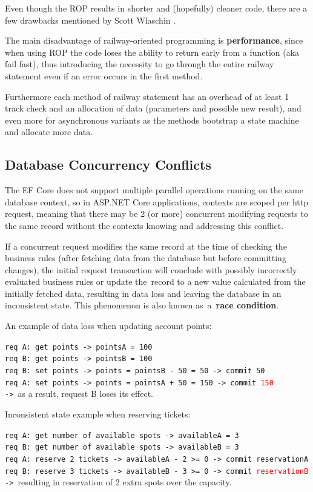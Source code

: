 Even though the ROP results in shorter and (hopefully) cleaner code, there are a few drawbacks mentioned by Scott Wlaschin \cite{scott_wlaschin:norop}.

The main disadvantage of railway-oriented programming is \textbf{performance}, since when using ROP the code loses the ability to return early from a function (aka fail fast), thus introducing the necessity to go through the entire railway statement even if an error occurs in the first method.

Furthermore each method of railway statement has an overhead of at least 1 track check and an allocation of data (parameters and possible new result), and even more for asynchronous variants as the methods bootstrap a state machine and allocate more data.

\subsection{Database Concurrency Conflicts}
\label{dev:conccurency_conflicts}
The EF Core does not support multiple parallel operations running on the same database context, so in ASP.NET Core applications, contexts are scoped per http request, meaning that there may be 2 (or more) concurrent modifying requests to the same record without the contexts knowing and addressing this conflict.

If a concurrent request modifies the same record at the time of checking the business rules (after fetching data from the database but before committing changes), the initial request transaction will conclude with possibly incorrectly evaluated business rules or update the~record to a new value calculated from the initially fetched data, resulting in data loss and leaving the database in an inconsistent state. This phenomenon is also known as~a~\textbf{race condition}.

An example of data loss when updating account points:

\texttt{req A: get points -> pointsA = 100\\
req B: get points -> pointsB = 100\\
req B: set points -> points = pointsB - 50 = 50 -> commit 50\\
req A: set points -> points = pointsA + 50 = 150 -> commit \textcolor{red}{150}\\
-> }as a result, request B loses its effect.

Inconsistent state example when reserving tickets:

\texttt{req A: get number of available spots -> availableA = 3\\
req B: get number of available spots -> availableB = 3\\
req A: reserve 2 tickets -> availableA - 2 >= 0 -> commit reservationA\\
req B: reserve 3 tickets -> availableB - 3 >= 0 -> commit \textcolor{red}{reservationB}\\
-> }resulting in reservation of 2 extra spots over the capacity.

